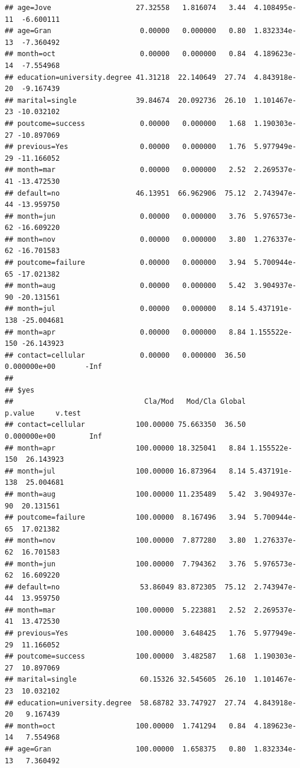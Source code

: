 \documentclass[
]{article}
\begin{document}
\begin{verbatim}
## age=Jove                    27.32558   1.816074   3.44  4.108495e-11  -6.600111
## age=Gran                     0.00000   0.000000   0.80  1.832334e-13  -7.360492
## month=oct                    0.00000   0.000000   0.84  4.189623e-14  -7.554968
## education=university.degree 41.31218  22.140649  27.74  4.843918e-20  -9.167439
## marital=single              39.84674  20.092736  26.10  1.101467e-23 -10.032102
## poutcome=success             0.00000   0.000000   1.68  1.190303e-27 -10.897069
## previous=Yes                 0.00000   0.000000   1.76  5.977949e-29 -11.166052
## month=mar                    0.00000   0.000000   2.52  2.269537e-41 -13.472530
## default=no                  46.13951  66.962906  75.12  2.743947e-44 -13.959750
## month=jun                    0.00000   0.000000   3.76  5.976573e-62 -16.609220
## month=nov                    0.00000   0.000000   3.80  1.276337e-62 -16.701583
## poutcome=failure             0.00000   0.000000   3.94  5.700944e-65 -17.021382
## month=aug                    0.00000   0.000000   5.42  3.904937e-90 -20.131561
## month=jul                    0.00000   0.000000   8.14 5.437191e-138 -25.004681
## month=apr                    0.00000   0.000000   8.84 1.155522e-150 -26.143923
## contact=cellular             0.00000   0.000000  36.50  0.000000e+00       -Inf
## 
## $yes
##                               Cla/Mod   Mod/Cla Global       p.value     v.test
## contact=cellular            100.00000 75.663350  36.50  0.000000e+00        Inf
## month=apr                   100.00000 18.325041   8.84 1.155522e-150  26.143923
## month=jul                   100.00000 16.873964   8.14 5.437191e-138  25.004681
## month=aug                   100.00000 11.235489   5.42  3.904937e-90  20.131561
## poutcome=failure            100.00000  8.167496   3.94  5.700944e-65  17.021382
## month=nov                   100.00000  7.877280   3.80  1.276337e-62  16.701583
## month=jun                   100.00000  7.794362   3.76  5.976573e-62  16.609220
## default=no                   53.86049 83.872305  75.12  2.743947e-44  13.959750
## month=mar                   100.00000  5.223881   2.52  2.269537e-41  13.472530
## previous=Yes                100.00000  3.648425   1.76  5.977949e-29  11.166052
## poutcome=success            100.00000  3.482587   1.68  1.190303e-27  10.897069
## marital=single               60.15326 32.545605  26.10  1.101467e-23  10.032102
## education=university.degree  58.68782 33.747927  27.74  4.843918e-20   9.167439
## month=oct                   100.00000  1.741294   0.84  4.189623e-14   7.554968
## age=Gran                    100.00000  1.658375   0.80  1.832334e-13   7.360492

\end{verbatim}
\end{document}
